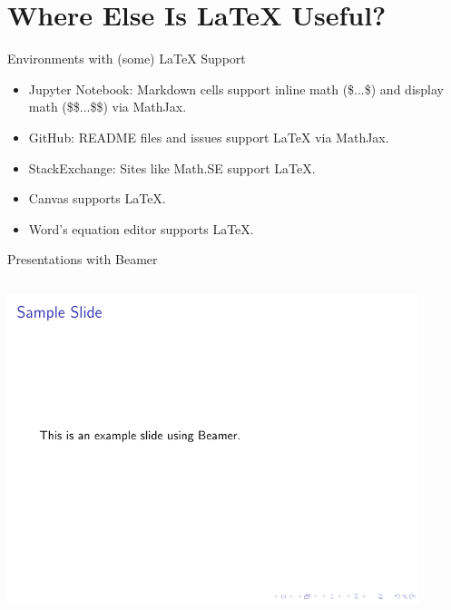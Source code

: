 \documentclass[aspectratio=1610]{beamer}
\begin{document}
\section{Where Else Is \LaTeX{} Useful?}

\begin{frame}[fragile]{Environments with (some) \LaTeX{} Support}
\begin{itemize}
 \item Jupyter Notebook: Markdown cells support inline math (\$...\$)
  and display math (\$\$...\$\$) via MathJax.
 \item GitHub: README files and issues support LaTeX via MathJax.
 \item StackExchange: Sites like Math.SE support LaTeX.
 \item Canvas supports LaTeX.
 \item Word's equation editor supports LaTeX.
\end{itemize}
\end{frame}

\begin{frame}[fragile]{Presentations with Beamer}
 \begin{columns}[T]


      



      \includegraphics[width=0.9\textwidth, frame]{example_beamer.pdf}

  \end{columns}
\end{frame}
\end{document}
